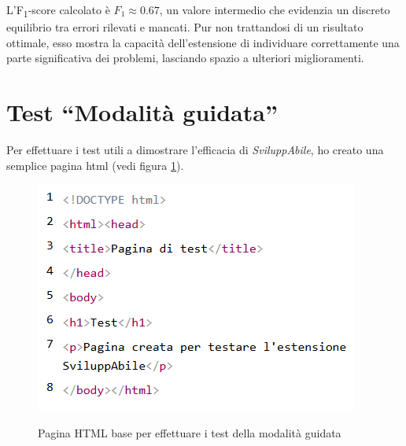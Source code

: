\noindent L'F\textsubscript{1}-score calcolato è $F_{1} \approx 0.67$, un valore intermedio che evidenzia un discreto equilibrio tra errori rilevati e mancati. 
Pur non trattandosi di un risultato ottimale, esso mostra la capacità dell’estensione di individuare correttamente una parte significativa dei problemi, lasciando spazio a ulteriori miglioramenti.

\section{Test ``Modalità guidata''}
\noindent Per effettuare i test utili a dimostrare l'efficacia di \textit{SviluppAbile}, ho creato una semplice pagina \acrshort{html} (vedi figura \ref{fig:pagina_test}).
\begin{figure}[H]
    \centering
    \includegraphics[width=0.5\linewidth, alt={Pagina \acrshort{html} base per effettuare i test della modalità guidata}]{img/test_MG.png}
    \caption{Pagina HTML base per effettuare i test della modalità guidata}\label{fig:pagina_test}
\end{figure}

